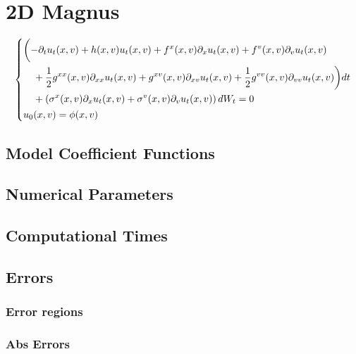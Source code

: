 \section{2D Magnus}
\begin{align*}
\left\{
\begin{aligned}[c]\arraycolsep=0pt
&
\begin{aligned}[t]\arraycolsep=0pt
&\biggl(
-\partial_t u_t(x,v) 
+ h(x,v) u_t(x,v)
+ f^x(x,v) \partial_x u_t(x,v)
+ f^v(x,v) \partial_v u_t(x,v)
\\&\quad
+ \frac{1}{2} g^{xx}(x,v) \partial_{xx} u_t(x,v)
+ g^{xv}(x,v) \partial_{xv} u_t(x,v)
+ \frac{1}{2} g^{vv}(x,v) \partial_{vv} u_t(x,v)
\biggr) dt
\\&\quad
+ \left(\sigma^{x}(x,v) \partial_{x} u_t(x,v) 
+ \sigma^{v}(x,v) \partial_{v} u_t(x,v)\right) dW_t
= 0
\end{aligned}\\&
u_0(x,v)=\phi(x,v)
\end{aligned}
\right.
\end{align*}
\subsection{Model Coefficient Functions}
	
	\modelCoeff


\subsection{Numerical Parameters}
	
	\timeParam


	\positionParam


	\velocityParam


\subsection{Computational Times}
	
	\compTimes


\subsection{Errors}
\subsubsection{Error regions}
	
	\errorRegion


\subsubsection{Abs Errors}
	
	\absErrorsEulerRef


